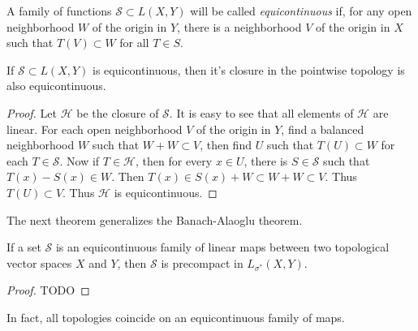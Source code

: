 A family of functions $\mathcal{S} \subset L(X,Y)$ will be called \emph{equicontinuous} if, for any open neighborhood $W$ of the origin in $Y$, there is a neighborhood $V$ of the origin in $X$ such that $T(V) \subset W$ for all $T \in S$.

\begin{theorem}
    If $\mathcal{S} \subset L(X,Y)$ is equicontinuous, then it's closure in the pointwise topology is also equicontinuous.
\end{theorem}
\begin{proof}
    Let $\mathcal{H}$ be the closure of $\mathcal{S}$. It is easy to see that all elements of $\mathcal{H}$ are linear. For each open neighborhood $V$ of the origin in $Y$, find a balanced neighborhood $W$ such that $W + W \subset V$, then find $U$ such that $T(U) \subset W$ for each $T \in \mathcal{S}$. Now if $T \in \mathcal{H}$, then for every $x \in U$, there is $S \in \mathcal{S}$ such that $T(x) - S(x) \in W$. Then $T(x) \in S(x) + W \subset W + W \subset V$. Thus $T(U) \subset V$. Thus $\mathcal{H}$ is equicontinuous.
\end{proof}

The next theorem generalizes the Banach-Alaoglu theorem.

\begin{theorem}
    If a set $\mathcal{S}$ is an equicontinuous family of linear maps between two topological vector spaces $X$ and $Y$, then $\mathcal{S}$ is precompact in $L_{\sigma^*}(X,Y)$.
\end{theorem}
\begin{proof}
    TODO
\end{proof}

In fact, all topologies coincide on an equicontinuous family of maps.

